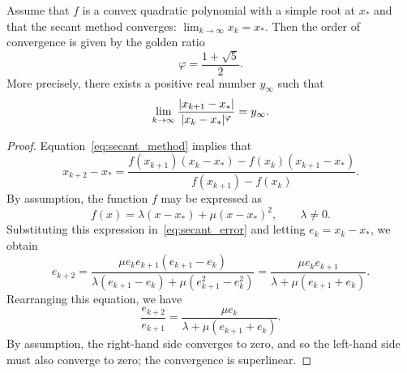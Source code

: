 \begin{theorem}
    Assume that $f$ is a convex quadratic polynomial with a simple root at $x_*$
    and that the secant method converges: $\lim_{k\to \infty} x_k = x_*$.
    Then the order of convergence is given by the golden ratio
    \[
        \varphi = \frac{1 + \sqrt{5}}{2}.
    \]
    More precisely, there exists a positive real number $y_{\infty}$ such that
    \begin{equation}
        \label{eq:convergence_secant}
        \lim_{k \to \infty} \frac{\lvert x_{k+1} - x_*\rvert}{\lvert x_{k} - x_*\rvert^{\varphi}} = y_{\infty}.
    \end{equation}
\end{theorem}
\begin{proof}
    Equation~\eqref{eq:secant_method} implies that
    \begin{equation*}
        \label{eq:secant_error}
        x_{k+2} - x_* = \frac{f(x_{k+1}) (x_k - x_*) - f(x_k) (x_{k+1}-x_*)}{f(x_{k+1}) - f(x_k)}.
    \end{equation*}
    By assumption, the function $f$ may be expressed as
    \[
        f(x) = \lambda (x - x_*) + \mu (x - x_*)^2, \qquad \lambda \neq 0.
    \]
    Substituting this expression in~\eqref{eq:secant_error} and letting $e_k = x_k - x_*$,
    we obtain
    \[
        e_{k+2}
        = \frac{\mu e_k e_{k+1} (e_{k+1} - e_{k})}{\lambda (e_{k+1} - e_k) + \mu (e_{k+1}^2 - e_k^2)}
        = \frac{\mu e_k e_{k+1}}{\lambda + \mu (e_{k+1} + e_k)}.
    \]
    Rearranging this equation,
    we have
    \begin{equation}
        \label{eq:secant_method_rearranged}
        \frac{e_{k+2}}{e_{k+1}}
        = \frac{\mu e_k}{\lambda + \mu (e_{k+1} + e_k)}.
    \end{equation}
    By assumption, the right-hand side converges to zero,
    and so the left-hand side must also converge to zero;
    the convergence is superlinear.


\end{proof}

